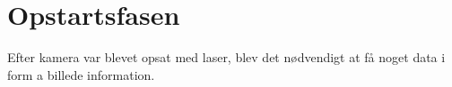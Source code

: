 \section{Opstartsfasen}

Efter kamera var blevet opsat med laser, blev det nødvendigt at få noget data i form a billede information.
